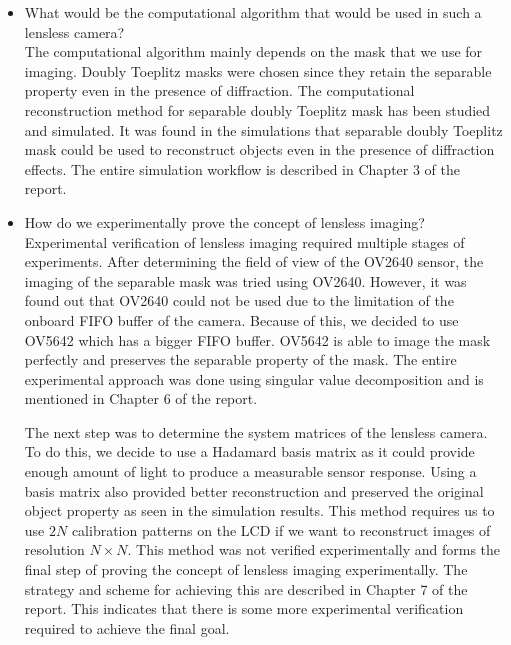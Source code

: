 \begin{itemize}
\item What would be the computational algorithm that would be used in such a lensless camera? \\
The computational algorithm mainly depends on the mask that we use for imaging. Doubly Toeplitz masks were chosen since they retain the separable property even in the presence of diffraction. The computational reconstruction method for separable doubly Toeplitz mask has been studied and simulated. It was found in the simulations that separable doubly Toeplitz mask could be used to reconstruct objects even in the presence of diffraction effects. The entire simulation workflow is described in Chapter 3 of the report.

\item How do we experimentally prove the concept of lensless imaging? \\
Experimental verification of lensless imaging required multiple stages of experiments. After determining the field of view of the OV2640 sensor, the imaging of the separable mask was tried using OV2640. However, it was found out that OV2640 could not be used due to the limitation of the onboard FIFO buffer of the camera. Because of this, we decided to use OV5642 which has a bigger FIFO buffer. OV5642 is able to image the mask perfectly and preserves the separable property of the mask. The entire experimental approach was done using singular value decomposition and is mentioned in Chapter 6 of the report.  

The next step was to determine the system matrices of the lensless camera. To do this, we decide to use a Hadamard basis matrix as it could provide enough amount of light to produce a measurable sensor response. Using a basis matrix also provided better reconstruction and preserved the original object property as seen in the simulation results. This method requires us to use $2N$ calibration patterns on the LCD if we want to reconstruct images of resolution $N \times N$. This method was not verified experimentally and forms the final step of proving the concept of lensless imaging experimentally. The strategy and scheme for achieving this are described in Chapter 7 of the report. This indicates that there is some more experimental verification required to achieve the final goal.

\end{itemize}

